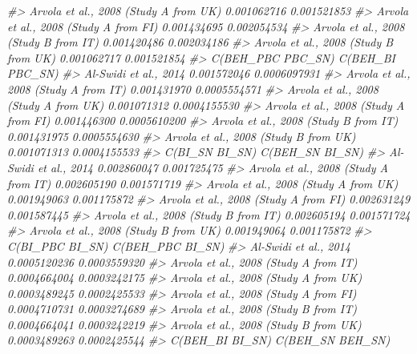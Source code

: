 \documentclass[
]{book}
\newenvironment{Shaded}{\begin{snugshade}}{\end{snugshade}}
\newcommand{\CommentTok}[1]{\textcolor[rgb]{0.56,0.35,0.01}{\textit{#1}}}
\begin{document}
\begin{Shaded}
\begin{Highlighting}[]
\CommentTok{\#\textgreater{} Arvola et al., 2008 (Study A from UK)      0.001062716      0.001521853}
\CommentTok{\#\textgreater{} Arvola et al., 2008 (Study A from FI)      0.001434695      0.002054534}
\CommentTok{\#\textgreater{} Arvola et al., 2008 (Study B from IT)      0.001420486      0.002034186}
\CommentTok{\#\textgreater{} Arvola et al., 2008 (Study B from UK)      0.001062717      0.001521854}
\CommentTok{\#\textgreater{}                                       C(BEH\_PBC PBC\_SN) C(BEH\_BI PBC\_SN)}
\CommentTok{\#\textgreater{} Al{-}Swidi et al., 2014                       0.001572046     0.0006097931}
\CommentTok{\#\textgreater{} Arvola et al., 2008 (Study A from IT)       0.001431970     0.0005554571}
\CommentTok{\#\textgreater{} Arvola et al., 2008 (Study A from UK)       0.001071312     0.0004155530}
\CommentTok{\#\textgreater{} Arvola et al., 2008 (Study A from FI)       0.001446300     0.0005610200}
\CommentTok{\#\textgreater{} Arvola et al., 2008 (Study B from IT)       0.001431975     0.0005554630}
\CommentTok{\#\textgreater{} Arvola et al., 2008 (Study B from UK)       0.001071313     0.0004155533}
\CommentTok{\#\textgreater{}                                       C(BI\_SN BI\_SN) C(BEH\_SN BI\_SN)}
\CommentTok{\#\textgreater{} Al{-}Swidi et al., 2014                    0.002860047     0.001725475}
\CommentTok{\#\textgreater{} Arvola et al., 2008 (Study A from IT)    0.002605190     0.001571719}
\CommentTok{\#\textgreater{} Arvola et al., 2008 (Study A from UK)    0.001949063     0.001175872}
\CommentTok{\#\textgreater{} Arvola et al., 2008 (Study A from FI)    0.002631249     0.001587445}
\CommentTok{\#\textgreater{} Arvola et al., 2008 (Study B from IT)    0.002605194     0.001571724}
\CommentTok{\#\textgreater{} Arvola et al., 2008 (Study B from UK)    0.001949064     0.001175872}
\CommentTok{\#\textgreater{}                                       C(BI\_PBC BI\_SN) C(BEH\_PBC BI\_SN)}
\CommentTok{\#\textgreater{} Al{-}Swidi et al., 2014                    0.0005120236     0.0003559320}
\CommentTok{\#\textgreater{} Arvola et al., 2008 (Study A from IT)    0.0004664004     0.0003242175}
\CommentTok{\#\textgreater{} Arvola et al., 2008 (Study A from UK)    0.0003489245     0.0002425533}
\CommentTok{\#\textgreater{} Arvola et al., 2008 (Study A from FI)    0.0004710731     0.0003274689}
\CommentTok{\#\textgreater{} Arvola et al., 2008 (Study B from IT)    0.0004664041     0.0003242219}
\CommentTok{\#\textgreater{} Arvola et al., 2008 (Study B from UK)    0.0003489263     0.0002425544}
\CommentTok{\#\textgreater{}                                       C(BEH\_BI BI\_SN) C(BEH\_SN BEH\_SN)}

\end{Highlighting}
\end{Shaded}
\end{document}
